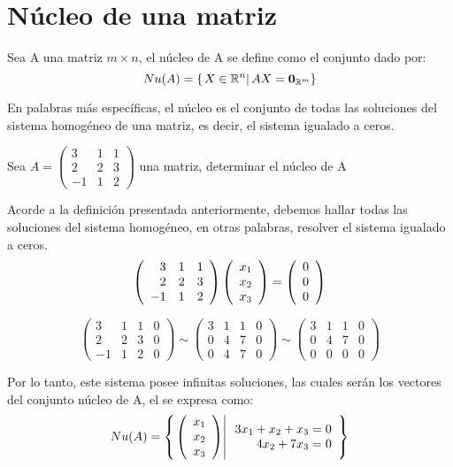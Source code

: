 \newpage
\section{Núcleo de una matriz}
\begin{dfn}
Sea A una matriz $m\times n$, el núcleo de A se define como el conjunto dado por:
~\\
\[Nu(A)=\left\{ \left. X \in \mathbb{R}^n \right| AX=\mathbf{0}_{\mathbb{R}^m} \right\}\]
\end{dfn}
En palabras más específicas, el núcleo es el conjunto de todas las soluciones del sistema homogéneo de una matriz, es decir, el sistema igualado a ceros.
~\\

\begin{ejemplo}
Sea $A=
\left(
\begin{array}{rrr}
3&1&1\\
2&2&3\\
-1&1&2
\end{array}
\right)$ una matriz, determinar el núcleo de A
 
Acorde a la definición presentada anteriormente, debemos hallar todas las soluciones del sistema homogéneo, en otras palabras, resolver el sistema igualado a ceros.
\[
\left(
\begin{array}{rrr}
3&1&1\\
2&2&3\\
-1&1&2
\end{array}
\right)
\left( \begin{array}{r} x_1\\ x_2\\ x_3 \end{array} \right) =
\left( \begin{array}{r} 0\\ 0\\ 0 \end{array} \right) 
\]

\[
\left(
\begin{array}{rrr|r}
3&1&1&0\\
2&2&3&0\\
-1&1&2&0
\end{array}
\right)
\sim
\left(
\begin{array}{rrr|r}
3&1&1&0\\
0&4&7&0\\
0&4&7&0
\end{array}
\right)
\sim
\left(
\begin{array}{rrr|r}
3&1&1&0\\
0&4&7&0\\
0&0&0&0
\end{array}
\right)
\]

Por lo tanto, este sistema posee infinitas soluciones, las cuales serán los vectores del conjunto núcleo de A, el se expresa como:
\[Nu(A)=\left\{ \left. \left( \begin{array}{r} x_1\\ x_2\\ x_3 \end{array} \right) \right| \begin{array}{r}
3x_1+x_2+x_3=0\\
4x_2+7x_3=0\\
\end{array} \right\}
\]

\end{ejemplo}

